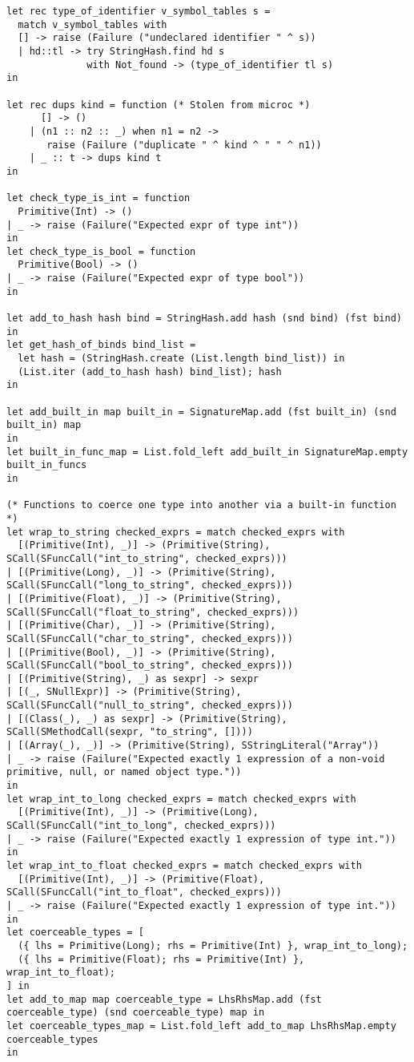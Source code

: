 \documentclass{article}
\begin{document}
\begin{verbatim}
let rec type_of_identifier v_symbol_tables s =
  match v_symbol_tables with
  [] -> raise (Failure ("undeclared identifier " ^ s))
  | hd::tl -> try StringHash.find hd s
              with Not_found -> (type_of_identifier tl s)
in

let rec dups kind = function (* Stolen from microc *)
      [] -> ()
    | (n1 :: n2 :: _) when n1 = n2 ->
       raise (Failure ("duplicate " ^ kind ^ " " ^ n1))
    | _ :: t -> dups kind t
in

let check_type_is_int = function
  Primitive(Int) -> ()
| _ -> raise (Failure("Expected expr of type int"))
in
let check_type_is_bool = function
  Primitive(Bool) -> ()
| _ -> raise (Failure("Expected expr of type bool"))
in

let add_to_hash hash bind = StringHash.add hash (snd bind) (fst bind) in
let get_hash_of_binds bind_list =
  let hash = (StringHash.create (List.length bind_list)) in
  (List.iter (add_to_hash hash) bind_list); hash
in

let add_built_in map built_in = SignatureMap.add (fst built_in) (snd built_in) map
in
let built_in_func_map = List.fold_left add_built_in SignatureMap.empty built_in_funcs
in

(* Functions to coerce one type into another via a built-in function *)
let wrap_to_string checked_exprs = match checked_exprs with
  [(Primitive(Int), _)] -> (Primitive(String), SCall(SFuncCall("int_to_string", checked_exprs)))
| [(Primitive(Long), _)] -> (Primitive(String), SCall(SFuncCall("long_to_string", checked_exprs)))
| [(Primitive(Float), _)] -> (Primitive(String), SCall(SFuncCall("float_to_string", checked_exprs)))
| [(Primitive(Char), _)] -> (Primitive(String), SCall(SFuncCall("char_to_string", checked_exprs)))
| [(Primitive(Bool), _)] -> (Primitive(String), SCall(SFuncCall("bool_to_string", checked_exprs)))
| [(Primitive(String), _) as sexpr] -> sexpr
| [(_, SNullExpr)] -> (Primitive(String), SCall(SFuncCall("null_to_string", checked_exprs)))
| [(Class(_), _) as sexpr] -> (Primitive(String), SCall(SMethodCall(sexpr, "to_string", [])))
| [(Array(_), _)] -> (Primitive(String), SStringLiteral("Array"))
| _ -> raise (Failure("Expected exactly 1 expression of a non-void primitive, null, or named object type."))
in
let wrap_int_to_long checked_exprs = match checked_exprs with
  [(Primitive(Int), _)] -> (Primitive(Long), SCall(SFuncCall("int_to_long", checked_exprs)))
| _ -> raise (Failure("Expected exactly 1 expression of type int."))
in
let wrap_int_to_float checked_exprs = match checked_exprs with
  [(Primitive(Int), _)] -> (Primitive(Float), SCall(SFuncCall("int_to_float", checked_exprs)))
| _ -> raise (Failure("Expected exactly 1 expression of type int."))
in
let coerceable_types = [
  ({ lhs = Primitive(Long); rhs = Primitive(Int) }, wrap_int_to_long);
  ({ lhs = Primitive(Float); rhs = Primitive(Int) }, wrap_int_to_float);
] in
let add_to_map map coerceable_type = LhsRhsMap.add (fst coerceable_type) (snd coerceable_type) map in
let coerceable_types_map = List.fold_left add_to_map LhsRhsMap.empty coerceable_types
in


\end{verbatim}
\end{document}
